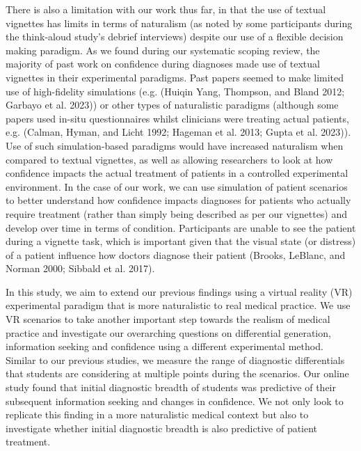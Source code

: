 \documentclass[a4paper, nobind]{templates/ociamthesis}
\begin{document}
\hfill\break
There is also a limitation with our work thus far, in that the use of textual vignettes has limits in terms of naturalism (as noted by some participants during the think-aloud study's debrief interviews) despite our use of a flexible decision making paradigm. As we found during our systematic scoping review, the majority of past work on confidence during diagnoses made use of textual vignettes in their experimental paradigms. Past papers seemed to make limited use of high-fidelity simulations (e.g. (Huiqin Yang, Thompson, and Bland 2012; Garbayo et al. 2023)) or other types of naturalistic paradigms (although some papers used in-situ questionnaires whilst clinicians were treating actual patients, e.g. (Calman, Hyman, and Licht 1992; Hageman et al. 2013; Gupta et al. 2023)). Use of such simulation-based paradigms would have increased naturalism when compared to textual vignettes, as well as allowing researchers to look at how confidence impacts the actual treatment of patients in a controlled experimental environment. In the case of our work, we can use simulation of patient scenarios to better understand how confidence impacts diagnoses for patients who actually require treatment (rather than simply being described as per our vignettes) and develop over time in terms of condition. Participants are unable to see the patient during a vignette task, which is important given that the visual state (or distress) of a patient influence how doctors diagnose their patient (Brooks, LeBlanc, and Norman 2000; Sibbald et al. 2017).

\hfill\break
In this study, we aim to extend our previous findings using a virtual reality (VR) experimental paradigm that is more naturalistic to real medical practice. We use VR scenarios to take another important step towards the realism of medical practice and investigate our overarching questions on differential generation, information seeking and confidence using a different experimental method. Similar to our previous studies, we measure the range of diagnostic differentials that students are considering at multiple points during the scenarios. Our online study found that initial diagnostic breadth of students was predictive of their subsequent information seeking and changes in confidence. We not only look to replicate this finding in a more naturalistic medical context but also to investigate whether initial diagnostic breadth is also predictive of patient treatment.
\end{document}
